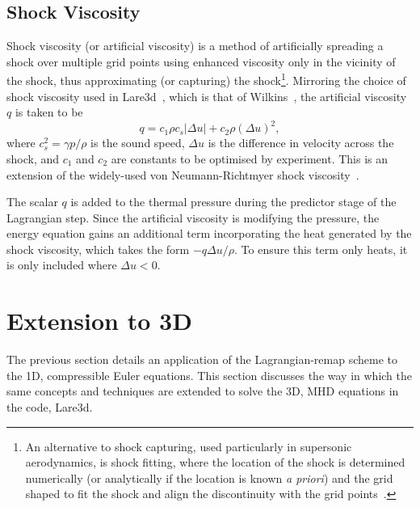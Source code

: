 \subsection{Shock Viscosity}

Shock viscosity (or artificial viscosity) is a method of artificially spreading a shock over multiple grid points using enhanced viscosity only in the vicinity of the shock, thus approximating (or capturing) the shock\footnote{An alternative to shock capturing, used particularly in supersonic aerodynamics, is shock fitting, where the location of the shock is determined numerically (or analytically if the location is known \emph{a priori}) and the grid shaped to fit the shock and align the discontinuity with the grid points~\cite{paciorriShockfittingTechnique2D2009}.}. Mirroring the choice of shock viscosity used in Lare3d~\cite{arberStaggeredGridLagrangian2001}, which is that of Wilkins~\cite{wilkinsUseArtificialViscosity1980a}, the artificial viscosity $q$ is taken to be
\begin{equation}
  \label{eq:artificial_viscosity}
q = c_1 \rho c_s | \Delta u | + c_2 \rho (\Delta u)^2,
\end{equation}
where $c_s^2 = \gamma p / \rho$ is the sound speed, $\Delta u$ is the difference in velocity across the shock, and $c_1$ and $c_2$ are constants to be optimised by experiment. This is an extension of the widely-used von Neumann-Richtmyer shock viscosity~\cite{vonneumannMethodNumericalCalculation1950}.

The scalar $q$ is added to the thermal pressure during the predictor stage of the Lagrangian step. Since the artificial viscosity is modifying the pressure, the energy equation gains an additional term incorporating the heat generated by the shock viscosity, which takes the form $-q\Delta u/\rho$. To ensure this term only heats, it is only included where $\Delta u < 0$. 

\section{Extension to 3D}

The previous section details an application of the Lagrangian-remap scheme to the 1D, compressible Euler equations. This section discusses the way in which the same concepts and techniques are extended to solve the 3D, MHD equations in the code, Lare3d.

